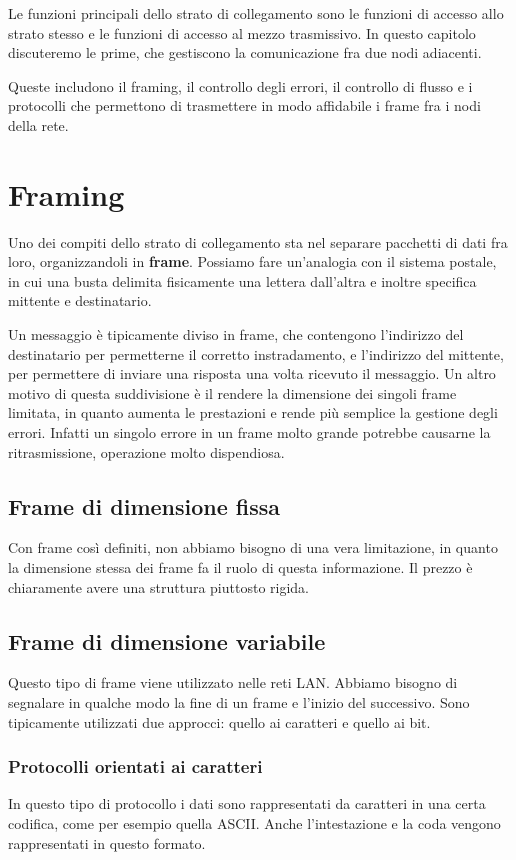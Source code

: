 Le funzioni principali dello strato di collegamento sono le funzioni di accesso allo strato stesso e le funzioni di accesso al mezzo trasmissivo. In questo capitolo discuteremo le prime, che gestiscono la comunicazione fra due nodi adiacenti.

Queste includono il framing, il controllo degli errori, il controllo di flusso e i protocolli che permettono di trasmettere in modo affidabile i frame fra i nodi della rete.

\section{Framing}
    Uno dei compiti dello strato di collegamento sta nel separare pacchetti di dati fra loro, organizzandoli in \textbf{frame}. Possiamo fare un'analogia con il sistema postale, in cui una busta delimita fisicamente una lettera dall'altra e inoltre specifica mittente e destinatario.
    
    Un messaggio è tipicamente diviso in frame, che contengono l'indirizzo del destinatario per permetterne il corretto instradamento, e l'indirizzo del mittente, per permettere di inviare una risposta una volta ricevuto il messaggio. Un altro motivo di questa suddivisione è il rendere la dimensione dei singoli frame limitata, in quanto aumenta le prestazioni e rende più semplice la gestione degli errori. Infatti un singolo errore in un frame molto grande potrebbe causarne la ritrasmissione, operazione molto dispendiosa.
    
    \subsection{Frame di dimensione fissa}
        Con frame così definiti, non abbiamo bisogno di una vera limitazione, in quanto la dimensione stessa dei frame fa il ruolo di questa informazione. Il prezzo è chiaramente avere una struttura piuttosto rigida.
        
    \subsection{Frame di dimensione variabile}
        Questo tipo di frame viene utilizzato nelle reti LAN. Abbiamo bisogno di segnalare in qualche modo la fine di un frame e l'inizio del successivo. Sono tipicamente utilizzati due approcci: quello ai caratteri e quello ai bit.
        
        \subsubsection{Protocolli orientati ai caratteri}
            In questo tipo di protocollo i dati sono rappresentati da caratteri in una certa codifica, come per esempio quella ASCII. Anche l'intestazione e la coda vengono rappresentati in questo formato.
            
